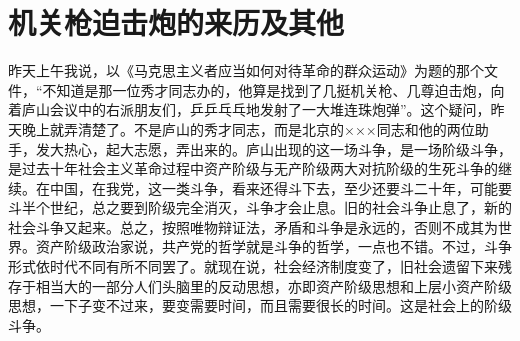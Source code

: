 \section[机关枪迫击炮的来历及其他（一九五九年八月十六日）]{机关枪迫击炮的来历及其他}


昨天上午我说，以《马克思主义者应当如何对待革命的群众运动》为题的那个文件，“不知道是那一位秀才同志办的，他算是找到了几挺机关枪、几尊迫击炮，向着庐山会议中的右派朋友们，乒乒乓乓地发射了一大堆连珠炮弹”。这个疑问，昨天晚上就弄清楚了。不是庐山的秀才同志，而是北京的×××同志和他的两位助手，发大热心，起大志愿，弄出来的。庐山出现的这一场斗争，是一场阶级斗争，是过去十年社会主义革命过程中资产阶级与无产阶级两大对抗阶级的生死斗争的继续。在中国，在我党，这一类斗争，看来还得斗下去，至少还要斗二十年，可能要斗半个世纪，总之要到阶级完全消灭，斗争才会止息。旧的社会斗争止息了，新的社会斗争又起来。总之，按照唯物辩证法，矛盾和斗争是永远的，否则不成其为世界。资产阶级政治家说，共产党的哲学就是斗争的哲学，一点也不错。不过，斗争形式依时代不同有所不同罢了。就现在说，社会经济制度变了，旧社会遗留下来残存于相当大的一部分人们头脑里的反动思想，亦即资产阶级思想和上层小资产阶级思想，一下子变不过来，要变需要时间，而且需要很长的时间。这是社会上的阶级斗争。

